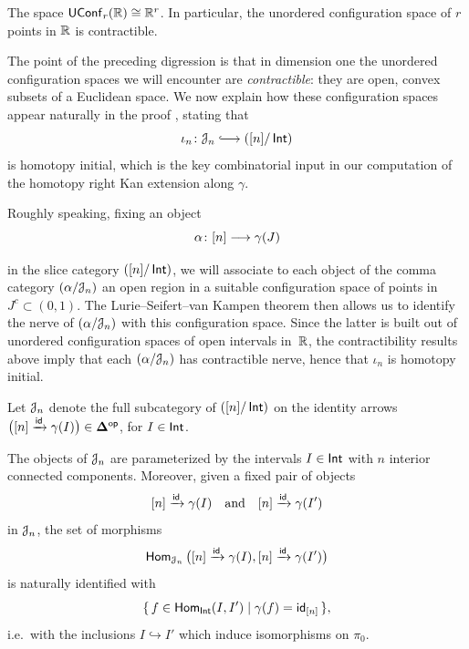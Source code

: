 \begin{lemma}
    The space $\mathsf{UConf}_{r}(\mathbb R) \cong \mathbb R^{r}$. In particular, the unordered configuration space of $r$ points in $\mathbb R$ is contractible.
\end{lemma}

The point of the preceding digression is that in dimension one the unordered
configuration spaces we will encounter are \emph{contractible}: they are open,
convex subsets of a Euclidean space. We now explain how these configuration
spaces appear naturally in the proof \textbf{}, stating that 
\begin{equation}
  \iota_n \maps \cJ_n \xlonghookra{\,\,\,\,\,\,\,} ([n]/\Int)
\end{equation}
is homotopy initial, which is the key combinatorial input in our computation of
the homotopy right Kan extension along $\gamma$.

Roughly speaking, fixing an object
\begin{equation}
  \alpha \colon [n] \longrightarrow \gamma(J)
\end{equation}

in the slice category $([n]/\operatorname{\mathsf{Int}})$, we will associate to each object of the
comma category $(\alpha / \mathcal J_n)$ an open region in a suitable configuration
space of points in $J^c \subset (0,1)$. The Lurie--Seifert--van Kampen theorem
then allows us to identify the nerve of $(\alpha / \mathcal J_n)$ with this
configuration space. Since the latter is built out of unordered configuration
spaces of open intervals in~$\mathbb R$, the contractibility results above imply that
each $(\alpha / \mathcal J_n)$ has contractible nerve, hence that $\iota_n$ is
homotopy initial.

\begin{definition}
Let $\mathcal J_n$ denote the full subcategory of $([n]/\operatorname{\mathsf{Int}})$ on the identity arrows $\big([n] \xrightarrow{\operatorname{\sf id}} \gamma(I)\big)\in \mathbf\Delta^{\mathsf{op}}$, for $I\in \operatorname{\mathsf{Int}}$.    
\end{definition}

\begin{observation}
    The objects of $\mathcal J_n$ are parameterized by the intervals $I\in \operatorname{\mathsf{Int}}$ with $n$ interior connected components. Moreover, given a fixed pair of objects 
    \[
      [n] \xrightarrow{\operatorname{\sf id}} \gamma(I)
      \quad\text{and}\quad
      [n] \xrightarrow{\operatorname{\sf id}} \gamma(I')
    \]
    in $\mathcal J_n$, the set of morphisms 
    \[
        \operatorname{\sf Hom}_{\mathcal J_n}\big([n] \xrightarrow{\operatorname{\sf id}} \gamma(I), [n] \xrightarrow{\operatorname{\sf id}} \gamma(I')\big)
    \]
    is naturally identified with
    \[
        \{\,f\in\operatorname{\sf Hom}_{\operatorname{\mathsf{Int}}}(I,I') \mid \gamma(f) = \operatorname{\sf id}_{[n]} \,\},
    \]
    i.e.\ with the inclusions $I \hookrightarrow I'$ which induce isomorphisms on $\pi_0$.
\end{observation}

